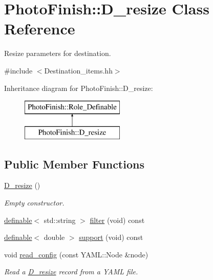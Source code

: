\hypertarget{class_photo_finish_1_1_d__resize}{}\section{Photo\+Finish\+:\+:D\+\_\+resize Class Reference}
\label{class_photo_finish_1_1_d__resize}


Resize parameters for destination.  




{\ttfamily \#include $<$Destination\+\_\+items.\+hh$>$}

Inheritance diagram for Photo\+Finish\+:\+:D\+\_\+resize\+:\begin{figure}[H]
\begin{center}
\leavevmode
\includegraphics[height=2.000000cm]{class_photo_finish_1_1_d__resize}
\end{center}
\end{figure}
\subsection*{Public Member Functions}
\begin{DoxyCompactItemize}
\item 
\hyperlink{class_photo_finish_1_1_d__resize_a105b90f42117f04e6ad834efb1530516}{D\+\_\+resize} ()
\begin{DoxyCompactList}\small\item\em Empty constructor. \end{DoxyCompactList}\item 
\hyperlink{class_photo_finish_1_1definable}{definable}$<$ std\+::string $>$ \hyperlink{class_photo_finish_1_1_d__resize_ae4ecb8ee5c62ea3d4170283a2e874faf}{filter} (void) const
\item 
\hyperlink{class_photo_finish_1_1definable}{definable}$<$ double $>$ \hyperlink{class_photo_finish_1_1_d__resize_a26e24da15f4e3a0b79117f54e0bc2983}{support} (void) const
\item 
void \hyperlink{class_photo_finish_1_1_d__resize_a57239d56c851a844ba7266d39b81eefc}{read\+\_\+config} (const Y\+A\+M\+L\+::\+Node \&node)
\begin{DoxyCompactList}\small\item\em Read a \hyperlink{class_photo_finish_1_1_d__resize}{D\+\_\+resize} record from a Y\+A\+ML file. \end{DoxyCompactList}\end{DoxyCompactItemize}
